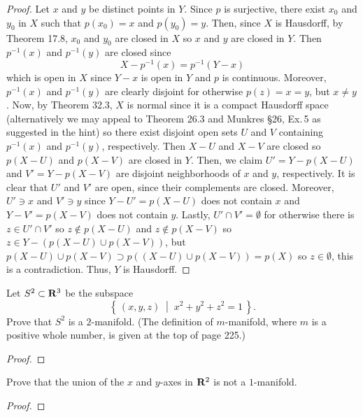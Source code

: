 \begin{proof}
Let $x$ and $y$ be distinct points in $Y$. Since $p$ is surjective, there
exist $x_0$ and $y_0$ in $X$ such that $p(x_0)=x$ and $p(y_0)=y$. Then,
since $X$ is Hausdorff, by Theorem 17.8, $x_0$ and $y_0$ are closed in $X$
so $x$ and $y$ are closed in $Y$. Then $p^{-1}(x)$ and $p^{-1}(y)$ are
closed since
\[
X-p^{-1}(x)=p^{-1}(Y-x)
\]
which is open in $X$ since $Y-x$ is open in $Y$ and $p$ is
continuous. Moreover, $p^{-1}(x)$ and $p^{-1}(y)$ are clearly disjoint for
otherwise $p(z)=x=y$, but $x\neq y$. Now, by Theorem 32.3, $X$ is normal
since it is a compact Hausdorff space (alternatively we may appeal to
Theorem 26.3 and Munkres \S 26, Ex.\,5 as suggested in the hint) so there
exist disjoint open sets $U$ and $V$ containing $p^{-1}(x)$ and
$p^{-1}(y)$, respectively. Then $X-U$ and $X-V$ are closed so $p(X-U)$ and
$p(X-V)$ are closed in $Y$. Then, we claim $U'=Y-p(X-U)$ and $V'=Y-p(X-V)$
are disjoint neighborhoods of $x$ and $y$, respectively. It is clear that
$U'$ and $V'$ are open, since their complements are closed. Moreover,
$U'\ni x$ and $V'\ni y$ since $Y-U'=p(X-U)$ does not contain $x$ and
$Y-V'=p(X-V)$ does not contain $y$. Lastly, $U'\cap V'=\emptyset$ for
otherwise there is $z\in U'\cap V'$ so $z\notin p(X-U)$ and $z\notin
p(X-V)$ so $z\in Y-(p(X-U)\cup p(X-V))$, but $p(X-U)\cup p(X-V)\supset
p((X-U)\cup p(X-V))=p(X)$ so $z\in\emptyset$, this is a
contradiction. Thus, $Y$ is Hausdorff.
\end{proof}
\newpage
\begin{problem}[(C)]
Let $S^2\subset\mathbf{R}^3$ be the subspace
\[
\left\{\,(x,y,z)\;\middle|\; x^2+y^2+z^2=1\,\right\}.
\]
Prove that $S^2$ is a $2$-manifold. (The definition of
$m$-manifold, where $m$ is a positive whole number, is given at
the top of page 225.)
\end{problem}
\begin{proof}
\end{proof}
\newpage
\begin{problem}[(D)]
Prove that the union of the $x$ and $y$-axes in $\mathbf{R}^2$ is not a
$1$-manifold.
\end{problem}
\begin{proof}
\end{proof}

